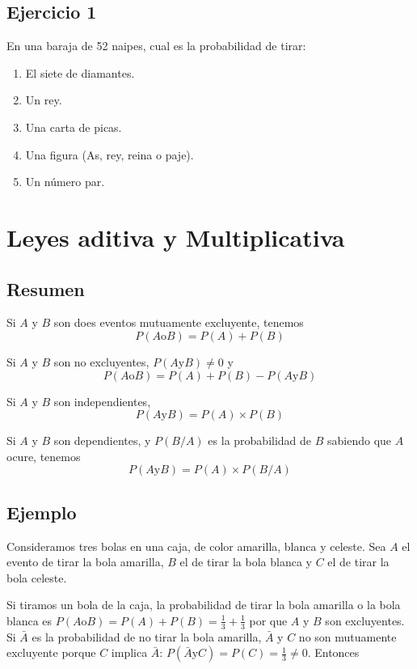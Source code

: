 \subsection{Ejercicio 1}

En una baraja de 52 naipes, cual es la probabilidad de tirar:

\begin{enumerate}
\item El siete de diamantes.
\item Un rey.
\item Una carta de picas.
\item Una figura (As, rey, reina o paje).
\item Un número par.
\end{enumerate}

\section{Leyes aditiva y Multiplicativa}

\subsection{Resumen}

Si $A$ y $B$ son does eventos mutuamente excluyente, tenemos
$$
P(A \text{o} B) = P(A) + P(B)
$$

Si $A$ y $B$ son no excluyentes, $P(A \text{y} B) \neq 0$ y
$$
P(A \text{o} B) = P(A) + P(B) - P(A \text{y} B)
$$

Si $A$ y $B$ son independientes,
$$
{P(A \text{y} B)} = {P(A)} \times {P(B)}
$$

Si $A$ y $B$ son dependientes, y $P\left(B/A\right)$ es la probabilidad
de $B$ sabiendo que $A$ ocure, tenemos
$$
{P(A \text{y} B)} = {P(A)} \times {P\left(B/A\right)}
$$

\subsection{Ejemplo}

Consideramos tres bolas en una caja, de color amarilla, blanca y celeste.
Sea $A$ el evento de tirar la bola amarilla, $B$ el de tirar la bola blanca
y $C$ el de tirar la bola celeste.

Si tiramos un bola de la caja, la probabilidad de tirar la bola amarilla o
la bola blanca es
$P(A \text{o} B) = P(A) + P(B) = \frac{1}{3} + \frac{1}{3}$ por que
$A$ y $B$ son excluyentes. Si $\bar{A}$ es la probabilidad de no tirar
la bola amarilla, $\bar{A}$ y $C$ no son mutuamente excluyente porque
$C$ implica $\bar{A}$:
$P(\bar{A} \text{y} C) = P(C) = \frac{1}{3} \neq 0$. Entonces

